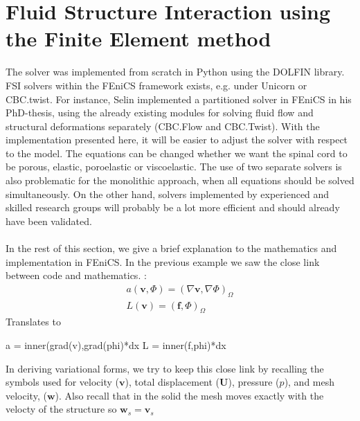 \section{Fluid Structure Interaction using the Finite Element method}
The solver was implemented from scratch in Python using the DOLFIN library. FSI solvers within the FEniCS framework exists, e.g. under Unicorn or CBC.twist. For instance, Selin \cite{Seli11} implemented a partitioned solver in FEniCS in his PhD-thesis, using the already existing modules for solving fluid flow and structural deformations separately (CBC.Flow and CBC.Twist). With the implementation presented here, it will be easier to adjust the solver with respect to the model. The equations can be changed whether we want the spinal cord to be porous, elastic, poroelastic or viscoelastic. The use of two separate solvers is also problematic for the monolithic approach, when all equations should be solved simultaneously. On the other hand, solvers implemented by experienced and skilled research groups will probably be a lot more efficient and should already have been validated. 
\\
\\
In the rest of this section, we give a brief explanation to the mathematics and implementation in FEniCS. In the previous example we saw the close link between code and mathematics. :
\begin{align*}
a(\mathbf{v},\Phi) = (\nabla \mathbf{v}, \nabla \Phi)_\Omega \\
L(\mathbf{v}) = (\mathbf{f},\Phi)_\Omega
\end{align*}
Translates to
\begin{center}
\begin{cverbatim}
a = inner(grad(v),grad(phi)*dx
L = inner(f,phi)*dx
\end{cverbatim}
\end{center}
In deriving variational forms, we try to keep this close link by recalling the symbols used for velocity ($\mathbf{v}$), total displacement ($\mathbf{U}$), pressure ($p$), and mesh velocity, ($\mathbf{w}$). Also recall that in the solid the mesh moves exactly with the velocty of the structure so $\mathbf{w}_s = \mathbf{v}_s$
\\

